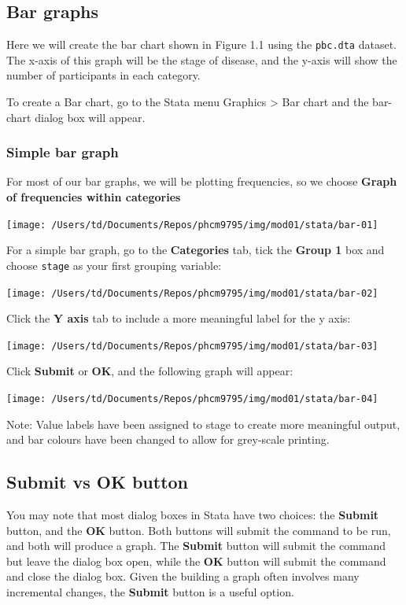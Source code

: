 \documentclass[
]{memoir}
\begin{document}
\hypertarget{bar-graphs-1}{%
\subsection{Bar graphs}\label{bar-graphs-1}}

Here we will create the bar chart shown in Figure 1.1 using the \texttt{pbc.dta} dataset. The x-axis of this graph will be the stage of disease, and the y-axis will show the number of participants in each category.

To create a Bar chart, go to the Stata menu Graphics \textgreater{} Bar chart and the bar-chart dialog box will appear.

\hypertarget{simple-bar-graph}{%
\subsubsection{Simple bar graph}\label{simple-bar-graph}}

For most of our bar graphs, we will be plotting frequencies, so we choose \textbf{Graph of frequencies within categories}

\texttt{[image: /Users/td/Documents/Repos/phcm9795/img/mod01/stata/bar-01]}

For a simple bar graph, go to the \textbf{Categories} tab, tick the \textbf{Group 1} box and choose \texttt{stage} as your first grouping variable:

\texttt{[image: /Users/td/Documents/Repos/phcm9795/img/mod01/stata/bar-02]}

Click the \textbf{Y axis} tab to include a more meaningful label for the y axis:

\texttt{[image: /Users/td/Documents/Repos/phcm9795/img/mod01/stata/bar-03]}

Click \textbf{Submit} or \textbf{OK}, and the following graph will appear:

\texttt{[image: /Users/td/Documents/Repos/phcm9795/img/mod01/stata/bar-04]}

Note: Value labels have been assigned to stage to create more meaningful output, and bar colours have been changed to allow for grey-scale printing.

\hypertarget{submit-vs-ok-button}{%
\subsection{Submit vs OK button}\label{submit-vs-ok-button}}

You may note that most dialog boxes in Stata have two choices: the \textbf{Submit} button, and the \textbf{OK} button. Both buttons will submit the command to be run, and both will produce a graph. The \textbf{Submit} button will submit the command but leave the dialog box open, while the \textbf{OK} button will submit the command and close the dialog box. Given the building a graph often involves many incremental changes, the \textbf{Submit} button is a useful option.
\end{document}
